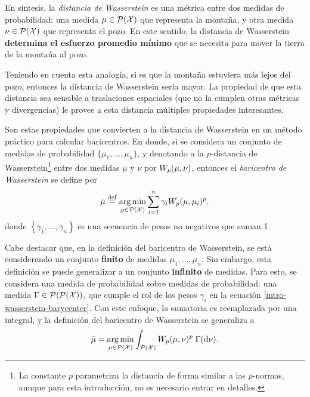 En síntesis, la \emph{distancia de Wasserstein} es una métrica entre dos medidas de probabilidad: una medida $\mu\in \ProbSpace[\cX]$ que representa la montaña, y otra medida $\nu\in \ProbSpace[\cX]$ que representa el pozo. En este sentido, la distancia de Wasserstein \textbf{determina el esfuerzo promedio mínimo} que se necesita para mover la tierra de la montaña al pozo.

Teniendo en cuenta esta analogía, si es que la montaña estuviera más lejos del pozo, entonces la distancia de Wasserstein sería mayor. La propiedad de que esta distancia sea sensible a traslaciones espaciales (que no la cumplen otras métricas y divergencias) le provee a esta distancia múltiples propiedades interesantes.

Son estas propiedades que convierten a la distancia de Wasserstein en un método práctico para calcular baricentros. En donde, si se considera un conjunto de medidas de probabilidad $\{\mu_1, \ldots, \mu_n\}$, y denotando a la $p$-distancia de Wasserstein\footnote{La constante $p$ parametriza la distancia de forma similar a las $p$-normas, aunque para esta introducción, no es necesario entrar en detalles.} entre dos medidas $\mu$ y $\nu$ por $\Wasserstein[p]{\mu}{\nu}$, entonces el \emph{baricentro de Wasserstein} se define por
\begin{equation}\label{intro-wasserstein-barycenter}
    \bar\mu \eqdef \argmin_{\mu \in \ProbSpace[\cX]} \sum_{i=1}^n \gamma_i \Wasserstein[p]{\mu}{\mu_i}^p.
\end{equation}
donde $\left\{ \gamma_1, \ldots, \gamma_n \right\}$ es una secuencia de pesos no negativos que suman 1.

Cabe destacar que, en la definición del baricentro de Wasserstein, se está considerando un conjunto \textbf{finito} de medidas $\mu_1, \ldots, \mu_n$. Sin embargo, esta definición se puede generalizar a un conjunto \textbf{infinito} de medidas. Para esto, se considera una medida de probabilidad sobre medidas de probabilidad: una medida $\Gamma \in \ProbSpace[\ProbSpace[\cX]]$, que cumple el rol de los pesos $\gamma_i$ en la ecuación \eqref{intro-wasserstein-barycenter}. Con este enfoque, la sumatoria es reemplazada por una integral, y la definición del baricentro de Wasserstein se generaliza a
\begin{equation}
    \bar\mu = \argmin_{\mu \in \ProbSpace[\cX]} \int_{\ProbSpace[\cX]} \Wasserstein[p]{\mu}{\nu}^p \; {\Gamma(\dd \nu)}.
\end{equation}

